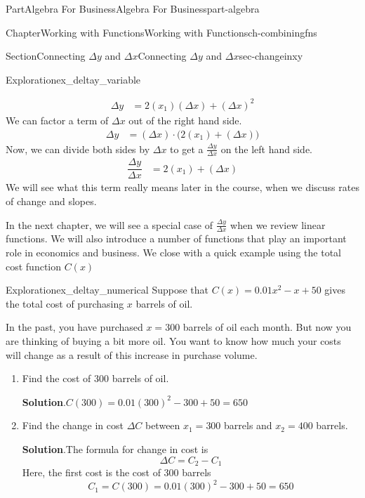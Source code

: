 \documentclass[oneside,10pt,]{tufte-book}
\newcommand{\blocktitlefont}{\relax}
\numberwithin{equation}{chapter}
\newcommand{\amp}{&}
\begin{document}
\begin{partptx}{Part}{Algebra For Business}{}{Algebra For Business}{}{}{part-algebra}
\begin{chapterptx}{Chapter}{Working with Functions}{}{Working with Functions}{}{}{ch-combiningfns}
\begin{sectionptx}{Section}{\textasteriskcentered{}Connecting \(\Delta y\) and \(\Delta x\)}{}{\textasteriskcentered{}Connecting \(\Delta y\) and \(\Delta x\)}{}{}{sec-changeinxy}
\begin{exploration}{Exploration}{}{ex_deltay_variable}
\begin{enumerate}[font=\bfseries,label=(\alph*),ref=\alph*]
\begin{align*}
\Delta y \amp = 2(x_1)(\Delta x)+(\Delta x)^2
\end{align*}
We can factor a term of \(\Delta x\) out of the right hand side.%
\begin{align*}
\Delta y \amp = (\Delta x)\cdot \Big(2(x_1)+(\Delta x)\Big)
\end{align*}
Now, we can divide both sides by \(\Delta x\) to get a \(\frac{\Delta y}{\Delta x}\) on the left hand side.%
\begin{align*}
\dfrac{\Delta y}{\Delta x} \amp =  2(x_1)+(\Delta x)
\end{align*}
We will see what this term really means later in the course, when we discuss rates of change and slopes.%
\end{enumerate}%
\end{exploration}%
In the next chapter, we will see a special case of \(\frac{\Delta y}{\Delta x}\) when we review linear functions.  We will also introduce a number of functions that play an important role in economics and business. We close with a quick example using the total cost function \(C(x)\)%
\begin{exploration}{Exploration}{}{ex_deltay_numerical}%
Suppose that \(C(x)= 0.01 x^2 - x+ 50\) gives the total cost of purchasing \(x\) barrels of oil.%
\par
In the past, you have purchased \(x=300\) barrels of oil each month. But now you are thinking of buying a bit more oil.  You want to know how much your costs will change as a result of this increase in purchase volume.%
\begin{enumerate}[font=\bfseries,label=(\alph*),ref=\alph*]%
\item{}Find the cost of \(300\) barrels of oil.%
\par\smallskip%
\noindent\textbf{\blocktitlefont Solution}.\hypertarget{ex_deltay_numerical-2-2}{}\quad{}\(C(300) = 0.01(300)^2 - 300 + 50 = 650\)%
\item{}Find the change in cost \(\Delta C\) between \(x_1=300\) barrels and \(x_2=400\) barrels.%
\par\smallskip%
\noindent\textbf{\blocktitlefont Solution}.\hypertarget{ex_deltay_numerical-3-2}{}\quad{}The formula for change in cost is%
\begin{equation*}
\Delta C = C_2 - C_1
\end{equation*}
Here, the first cost is the cost of 300 barrels%
\begin{equation*}
C_1 = C(300) = 0.01(300)^2 - 300 + 50 = 650

\end{equation*}
\end{enumerate}
\end{exploration}
\end{sectionptx}
\end{chapterptx}
\end{partptx}
\end{document}
